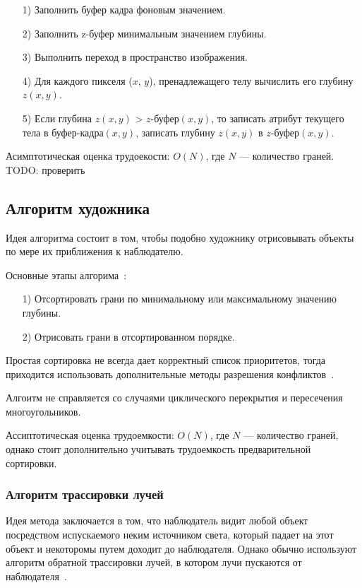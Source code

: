   \begin{enumerate}
   	\item[1)] Заполнить буфер кадра фоновым значением.
   	\item[2)] Заполнить z-буфер минимальным значением глубины.
   	\item[3)] Выполнить переход в пространство изображения.
   	\item[4)] Для каждого пикселя ($x$, $y$), пренадлежащего телу вычислить его глубину $z(x, y)$.
   	\item[5)] Если глубина $z(x, y)$ > $z\textit{-буфер}(x, y)$, то записать атрибут текущего тела в $\textit{буфер-кадра}(x, y)$, записать глубину $z(x, y)$ в $z\textit{-буфер}(x, y)$.
   \end{enumerate}
   
   
   Асимптотическая оценка трудоекости: $O(N)$, где $N$ --- количество граней. TODO: проверить
      
   \subsection{Алгоритм художника}
   
   Идея алгоритма состоит в том, чтобы подобно художнику отрисовывать объекты по мере их приближения к наблюдателю.
   
   Основные этапы алгорима~\cite{rogers}:
   \begin{enumerate}
   	\item[1)] Отсортировать грани по минимальному или максимальному значению глубины.
   	\item[2)] Отрисовать грани в отсортированном порядке.
   \end{enumerate}
   
   Простая сортировка не всегда дает корректный список приоритетов, тогда приходится использовать дополнительные методы разрешения конфликтов~\cite{rogers}. 
   
   Алгоитм не справляется со случаями циклического перекрытия и пересечения многоугольников.
   
   Ассиптотическая оценка трудоемкости: $O(N)$, где $N$ --- количество граней, однако стоит дополнительно учитывать трудоемкость предварительной сортировки.
     
    \subsubsection{Алгоритм трассировки лучей}
     Идея метода заключается в том, что наблюдатель видит любой объект посредством испускаемого неким источником света, который падает на этот объект и некоторомы путем доходит до наблюдателя. Однако обычно используют алгоритм обратной трассировки лучей, в котором лучи пускаются от наблюдателя~\cite{rogers}.
     

